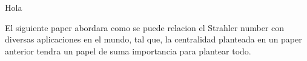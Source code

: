 
Hola


El siguiente paper abordara como se puede relacion el Strahler number con diversas aplicaciones en el mundo, tal que, la centralidad planteada en un paper anterior tendra un papel de suma importancia para plantear todo.
